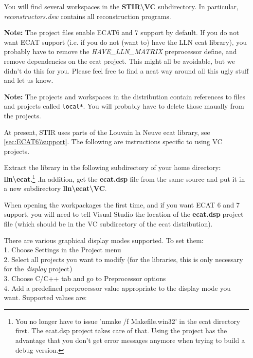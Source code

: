 \documentclass{article}
\newcommand{\tab}{\hspace{5mm}}
\begin{document}
You will find several workspaces in the \textbf{STIR{\textbackslash}VC} subdirectory. 
In particular, \textit{reconstructors.dsw} contains all reconstruction 
programs.



\textbf{Note:} The project files enable ECAT6 and 7 support by default. 
If you do not want ECAT support (i.e. if you do not (want to) 
have the LLN ecat library), you probably have to remove the \textit{HAVE\_LLN\_MATRIX} preprocessor 
define, and remove dependencies on the ecat project. This might 
all be avoidable, but we didn't do this for you. Please feel 
free to find a neat way around all this ugly stuff and let us 
know.

\textbf{Note:} The projects and workspaces in the distribution contain references to
files and projects called \texttt{local*}. You will probably have to delete those
maually from the projects.


At present, STIR uses parts of the Louvain la Neuve ecat library, see \ref{sec:ECAT67support}. 
The following are instructions specific to using VC projects.

Extract 
the library in the following subdirectory of your home directory: \textbf{lln{\textbackslash}ecat}.\footnote{{\small You 
no longer have to issue 'nmake /f Makefile.win32' in the ecat 
directory first. The ecat.dsp project takes care of that. Using 
the project has the advantage that you don't get error messages 
anymore when trying to build a debug version.}} .In addition, get 
the \textbf{ecat.dsp} file from the same source and put it in a new 
subdirectory \textbf{lln{\textbackslash}ecat{\textbackslash}VC}.



When opening the workpackages the first time, and if you want
ECAT 6 and 7 support, you will need to tell Visual 
Studio the location of the \textbf{ecat.dsp} project file (which should 
be in the VC subdirectory of the ecat distribution).


There are various graphical display modes supported. To set them:\\
1.\tab 
Choose Settings in the Project menu\\
2.\tab 
Select all projects you want to modify (for the libraries, this 
is only necessary for the \textit{display} project)\\
3.\tab 
Choose C/C++ tab and go to Preprocessor options\\
4.\tab 
Add a predefined preprocessor value appropriate to the display 
mode you want. Supported values are: 
\end{document}
